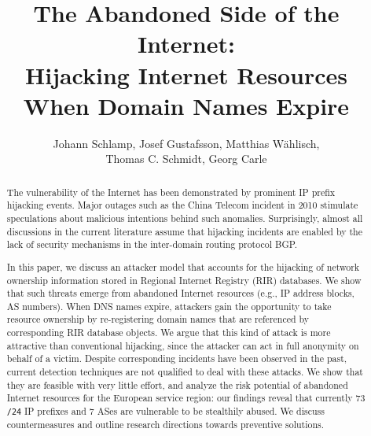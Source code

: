 \documentclass{llncs}
\begin{document}
\title{The Abandoned Side of the Internet:\\Hijacking Internet Resources When Domain Names Expire}
\author{Johann Schlamp, Josef Gustafsson, Matthias Wählisch,\\Thomas C. Schmidt, Georg Carle}
\maketitle
\pagestyle{empty}


\begin{abstract}

The vulnerability of the Internet has been demonstrated by prominent IP prefix
hijacking events. Major outages such as the China Telecom incident in 2010
stimulate speculations about malicious intentions behind such anomalies.
Surprisingly, almost all discussions in the current literature assume that
hijacking incidents are enabled by the lack of security mechanisms in the
inter-domain routing protocol BGP. 

In this paper, we discuss an attacker model that accounts for the hijacking of
network ownership information stored in Regional Internet Registry (RIR)
databases.  We show that such threats emerge from abandoned Internet resources
(e.g., IP address blocks, AS numbers).  When DNS names expire, attackers gain
the opportunity to take resource ownership by re-registering domain names that
are referenced by corresponding RIR database objects.  We argue that this kind
of attack is more attractive than conventional hijacking, since the attacker
can act in full anonymity on behalf of a victim. Despite corresponding
incidents have been observed in the past, current detection techniques are not
qualified to deal with these attacks. We show that they are feasible with very
little effort, and analyze the risk potential of abandoned Internet resources
for the European service region: our findings reveal that currently 73
\texttt{/24} IP prefixes and 7 ASes are vulnerable to be stealthily abused. We
discuss countermeasures and outline research directions towards preventive
solutions.

\end{abstract}
\end{document}
